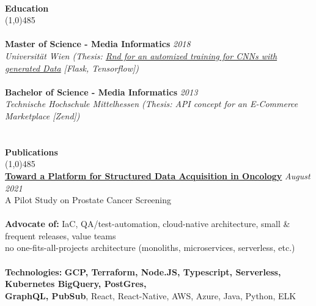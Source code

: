 \documentclass[9pt]{extarticle}
\newcommand\tab[1][1cm]{\hspace*{#1}}
\newcommand\smallspace[1][0.23cm]{\hspace*{#1}}
\newcommand\negativespace[1][-0.12cm]{\hspace*{#1}}
\begin{document}
\noindent %
\\
\vspace*{-6pt}
{\negativespace \Large \bf Education}\\
\line(1,0){485}\\
\\
\noindent
{\bf Master of Science - Media Informatics} \hfill \textit{2018} \\ 
\textit{Universität Wien (Thesis: \href{https://utheses.univie.ac.at/detail/48070/}{Rnd for an automized training for CNNs with generated Data} [Flask, Tensorflow])} \\\\
\noindent
{\bf Bachelor of Science - Media Informatics} \hfill \textit{2013} \\
\textit{Technische Hochschule Mittelhessen (Thesis: API concept for an E-Commerce Marketplace [Zend])} \\
\\
\\
\vspace*{-6pt}
{\negativespace \Large \bf Publications}\\
\line(1,0){485}\\
{\bf \href{https://www.researchgate.net/publication/354259954_Toward_a_Platform_for_Structured_Data_Acquisition_in_Oncology_A_Pilot_Study_on_Prostate_Cancer_Screening}{Toward a Platform for Structured Data Acquisition in Oncology}} \hfill \textit{August 2021} \\ 
A Pilot Study on Prostate Cancer Screening \\ 
\\

\noindent
{\bf Advocate of:}  IaC, QA/test-automation, cloud-native architecture, small \& frequent releases, value teams\\ 
 \tab \tab \smallspace no one-fits-all-projects architecture (monoliths, microservices, serverless, etc.) \\ \\
\noindent
{\bf Technologies:} \textbf{GCP, Terraform, Node.JS, Typescript, Serverless, Kubernetes BigQuery, PostGres, \\ 
\tab \tab \smallspace  GraphQL, PubSub}, React, React-Native, AWS, Azure, Java, Python, ELK
\end{document}
